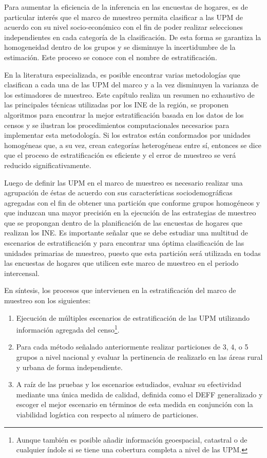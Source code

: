 \documentclass[
  12pt,
  spanish,
]{book}
\providecommand{\tightlist}{%
  \setlength{\itemsep}{0pt}\setlength{\parskip}{0pt}}
\begin{document}
Para aumentar la eficiencia de la inferencia en las encuestas de hogares, es de particular interés que el marco de muestreo permita clasificar a las UPM de acuerdo con su nivel socio-económico con el fin de poder realizar selecciones independientes en cada categoría de la clasificación. De esta forma se garantiza la homogeneidad dentro de los grupos y se disminuye la incertidumbre de la estimación. Este proceso se conoce con el nombre de estratificación.

En la literatura especializada, es posible encontrar varias metodologías que clasifican a cada una de las UPM del marco y a la vez disminuyen la varianza de los estimadores de muestreo. Este capítulo realiza un resumen no exhaustivo de las principales técnicas utilizadas por los INE de la región, se proponen algoritmos para encontrar la mejor estratificación basada en los datos de los censos y se ilustran los procedimientos computacionales necesarios para implementar esta metodología. Si los estratos están conformados por unidades homogéneas que, a su vez, crean categorías heterogéneas entre sí, entonces se dice que el proceso de estratificación es eficiente y el error de muestreo se verá reducido significativamente.

Luego de definir las UPM en el marco de muestreo es necesario realizar una agrupación de éstas de acuerdo con sus características sociodemográficas agregadas con el fin de obtener una partición que conforme grupos homogéneos y que induzcan una mayor precisión en la ejecución de las estrategias de muestreo que se propongan dentro de la planificación de las encuestas de hogares que realizan los INE. Es importante señalar que se debe estudiar una multitud de escenarios de estratificación y para encontrar una óptima clasificación de las unidades primarias de muestreo, puesto que esta partición será utilizada en todas las encuestas de hogares que utilicen este marco de muestreo en el periodo intercensal.

En síntesis, los procesos que intervienen en la estratificación del marco de muestreo son los siguientes:

\begin{enumerate}
\def\labelenumi{\arabic{enumi}.}
\tightlist
\item
  Ejecución de múltiples escenarios de estratificación de las UPM utilizando información agregada del censo\footnote{Aunque también es posible añadir información geoespacial, catastral o de cualquier índole si se tiene una cobertura completa a nivel de las UPM.}.
\item
  Para cada método señalado anteriormente realizar particiones de 3, 4, o 5 grupos a nivel nacional y evaluar la pertinencia de realizarlo en las áreas rural y urbana de forma independiente.
\item
  A raíz de las pruebas y los escenarios estudiados, evaluar su efectividad mediante una única medida de calidad, definida como el DEFF generalizado y escoger el mejor escenario en términos de esta medida en conjunción con la viabilidad logística con respecto al número de particiones.
\end{enumerate}
\end{document}
